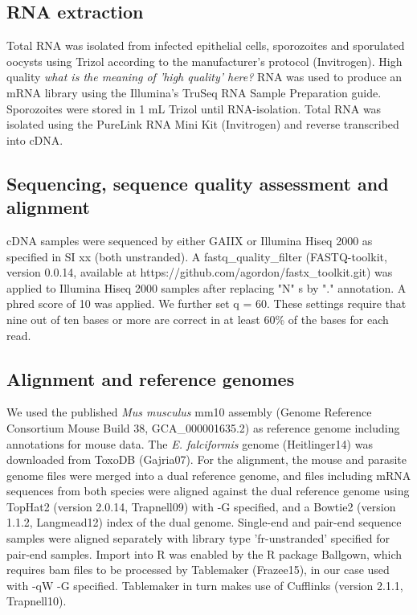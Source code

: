 \documentclass{bmcart}
\begin{document}
\subsection{RNA extraction}
Total RNA was isolated from infected epithelial cells, sporozoites and
sporulated oocysts using Trizol according to the manufacturer’s
protocol (Invitrogen). High quality \emph{what is the meaning of 'high
  quality' here?}  RNA was used to produce an mRNA library using the
Illumina’s TruSeq RNA Sample Preparation guide. Sporozoites were stored in 1 mL Trizol until
RNA-isolation. Total RNA was isolated using the PureLink RNA Mini Kit
(Invitrogen) and reverse transcribed into cDNA.

\subsection{Sequencing, sequence quality assessment and alignment}
cDNA samples were sequenced by either GAIIX or Illumina Hiseq 2000 as
specified in SI xx (both unstranded). A fastq\_quality\_filter
(FASTQ-toolkit, version 0.0.14, available at
https://github.com/agordon/fastx\_toolkit.git) was applied to Illumina
Hiseq 2000 samples after replacing "N" s by "." annotation.  A
phred score of 10 was applied. We further set q = 60. These settings
require that nine out of ten bases or more are correct in at least
60\% of the bases for each read.

\subsection{Alignment and reference genomes}
We used the published \textit{Mus musculus} mm10 assembly (Genome
Reference Consortium Mouse Build 38, GCA\_000001635.2) as reference
genome including annotations for mouse data. The
\textit{E. falciformis} genome (Heitlinger14) was downloaded from
ToxoDB (Gajria07). For the alignment, the mouse and parasite genome
files were merged into a dual reference genome, and files including
mRNA sequences from both species were aligned against the dual
reference genome using TopHat2 (version 2.0.14, Trapnell09) with -G
specified, and a Bowtie2 (version 1.1.2, Langmead12) index of the dual
genome. Single-end and pair-end sequence samples were aligned
separately with library type 'fr-unstranded' specified for pair-end
samples. Import into R was enabled by the R package Ballgown, which
requires bam files to be processed by Tablemaker (Frazee15), in our
case used with -qW -G specified. Tablemaker in turn makes use of
Cufflinks (version 2.1.1, Trapnell10).
\end{document}
